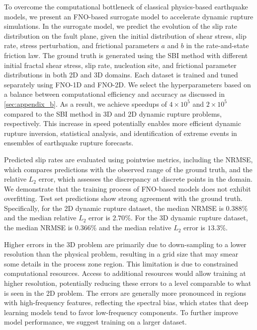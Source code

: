 \documentclass[draft]{agujournal2019}
\begin{document}
To overcome the computational bottleneck of classical physics-based earthquake models, we present an FNO-based surrogate model to accelerate dynamic rupture simulations. In the surrogate model, we predict the evolution of the slip rate distribution on the fault plane, given the initial distribution of shear stress, slip rate, stress perturbation, and frictional parameters \(a\) and \(b\) in the rate-and-state friction law. The ground truth is generated using the SBI method with different initial fractal shear stress, slip rate, nucleation site, and frictional parameter distributions in both 2D and 3D domains. Each dataset is trained and tuned separately using FNO-1D and FNO-2D. We select the hyperparameters based on a balance between computational efficiency and accuracy as discussed in \ref{sec:appendix_b}. As a result, we achieve speedups of \( 4 \times 10^5 \) and \( 2 \times 10^5 \) compared to the SBI method in 3D and 2D dynamic rupture problems, respectively. This increase in speed potentially enables more efficient dynamic rupture inversion, statistical analysis, and identification of extreme events in ensembles of earthquake rupture forecasts.

Predicted slip rates are evaluated using pointwise metrics, including the NRMSE, which compares predictions with the observed range of the ground truth, and the relative \(L_2\) error, which assesses the discrepancy at discrete points in the domain. We demonstrate that the training process of FNO-based models does not exhibit overfitting. Test set predictions show strong agreement with the ground truth. Specifically, for the 2D dynamic rupture dataset, the median NRMSE is \(0.388\%\) and the median relative \(L_2\) error is \(2.70\%\). For the 3D dynamic rupture dataset, the median NRMSE is \(0.366\%\) and the median relative \(L_2\) error is \(13.3\%\). 

Higher errors in the 3D problem are primarily due to down-sampling to a lower resolution than the physical problem, resulting in a grid size that may smear some details in the process zone region. This limitation is due to constrained computational resources. Access to additional resources would allow training at higher resolution, potentially reducing these errors to a level comparable to what is seen in the 2D problem. The errors are generally more pronounced in regions with high-frequency features, reflecting the spectral bias, which states that deep learning models tend to favor low-frequency components. To further improve model performance, we suggest training on a larger dataset.   
\end{document}
